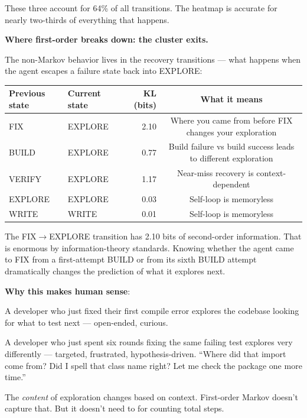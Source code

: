 \documentclass[11pt,a4paper]{article}
\begin{document}
These three account for 64\% of all transitions.
The heatmap is accurate for nearly two-thirds of everything that happens.

\textbf{Where first-order breaks down: the cluster exits.}

The non-Markov behavior lives in the recovery transitions ---
what happens when the agent escapes a failure state back into EXPLORE:

\begin{center}
\begin{tabular}{@{}llrc@{}}
\toprule
\textbf{Previous state} & \textbf{Current state} & \textbf{KL (bits)} & \textbf{What it means} \\
\midrule
FIX     & EXPLORE & 2.10 & Where you came from before FIX changes your exploration \\
BUILD   & EXPLORE & 0.77 & Build failure vs build success leads to different exploration \\
VERIFY  & EXPLORE & 1.17 & Near-miss recovery is context-dependent \\
\midrule
EXPLORE & EXPLORE & 0.03 & Self-loop is memoryless \\
WRITE   & WRITE   & 0.01 & Self-loop is memoryless \\
\bottomrule
\end{tabular}
\end{center}

The FIX$\to$EXPLORE transition has 2.10 bits of second-order information.
That is enormous by information-theory standards.
Knowing whether the agent came to FIX from a first-attempt BUILD
or from its sixth BUILD attempt dramatically changes the prediction of what it explores next.

\textbf{Why this makes human sense}:

\begin{analogybox}
A developer who just fixed their first compile error explores the codebase
looking for what to test next --- open-ended, curious.

A developer who just spent six rounds fixing the same failing test
explores very differently --- targeted, frustrated, hypothesis-driven.
``Where did that import come from? Did I spell that class name right?
Let me check the package one more time.''

The \emph{content} of exploration changes based on context.
First-order Markov doesn't capture that.
But it doesn't need to for counting total steps.
\end{analogybox}
\end{document}
